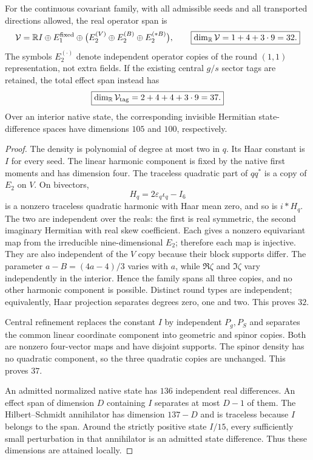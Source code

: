 \documentclass[12pt,a4paper]{article}
\begin{document}
\begin{theorem}
\label{p2c:thm:v226-whole-family-rank}
For the continuous covariant family, with all admissible seeds and all
transported directions allowed, the real operator span is
\[
 \mathcal V=\mathbb{R} I\oplus E_1^{\rm fixed}\oplus
                 \bigl(E_2^{(V)}\oplus E_2^{(B)}\oplus E_2^{(*B)}\bigr),
 \qquad \boxed{\dim_\mathbb{R}\mathcal V=1+4+3\cdot9=32.}
\]
The symbols $E_2^{(\cdot)}$ denote independent operator copies of the
round $(1,1)$ representation, not extra fields. If the existing central
$g/s$ sector tags are retained, the total effect span instead has
\[
 \boxed{\dim_\mathbb{R}\mathcal V_{\rm tag}=2+4+4+3\cdot9=37.}
\]
Over an interior native state, the corresponding invisible Hermitian
state-difference spaces have dimensions $105$ and $100$, respectively.
\end{theorem}
\begin{proof}
The density is polynomial of degree at most two in $q$. Its Haar constant
is $I$ for every seed. The linear harmonic component is fixed by the
native first moments and has dimension four. The traceless quadratic part
of $qq^*$ is a copy of $E_2$ on $V$. On bivectors,
\[
 H_q=2\varepsilon_q\iota_q-I_6
\]
is a nonzero traceless quadratic harmonic with Haar mean zero, and so is
$i*H_q$. The two are independent over the reals: the first is real symmetric,
the second imaginary Hermitian with real skew coefficient. Each gives a
nonzero equivariant map from the irreducible nine-dimensional $E_2$;
therefore each map is injective. They are also independent of the $V$ copy
because their block supports differ. The parameter $a-B=(4a-4)/3$ varies
with $a$, while $\Re\zeta$ and $\Im\zeta$ vary independently in the
interior. Hence the family spans all three copies, and no other harmonic
component is possible. Distinct round types are independent; equivalently,
Haar projection separates degrees zero, one and two. This proves $32$.

Central refinement replaces the constant $I$ by independent $P_g,P_S$ and
separates the common linear coordinate component into geometric and spinor
copies. Both are nonzero four-vector maps and have disjoint supports.
The spinor density has no quadratic component, so the three quadratic
copies are unchanged. This proves $37$.

An admitted normalized native state has $136$ independent real differences.
An effect span of dimension $D$ containing $I$ separates at most $D-1$ of
them. The Hilbert--Schmidt annihilator has dimension $137-D$ and is
traceless because $I$ belongs to the span. Around the strictly positive
state $I/15$, every sufficiently small perturbation in that annihilator
is an admitted state difference. Thus these dimensions are attained locally.
\end{proof}
\end{document}

